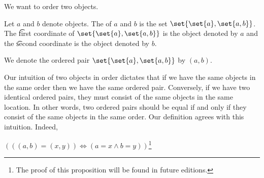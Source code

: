 

We want to order two objects.


Let $a$ and $b$ denote objects.
The  of $a$ and $b$ is the set $\set{\set{a}, \set{a, b}}$.
The \t{first coordinate} of $\set{\set{a}, \set{a, b}}$ is the object denoted by $a$ and the \t{second coordinate} is the object denoted by $b$.



We denote the ordered pair $\set{\set{a},\set{a,b}}$ by $(a, b)$.



Our intuition of two objects in order dictates that if we have the same objects in the same order then we have the same ordered pair.
Conversely, if we have two identical ordered pairs, they must consist of the same objects in the same location.
In other words, two ordered pairs should be equal if and only if they consist of the same objects in the same order.
Our definition agrees with this intuition.
Indeed,

\begin{proposition}
  $(((a, b) = (x, y)) \iff (a = x \land b = y))$\footnote{The proof of this proposition will be found in future editions.%
}
\end{proposition}

\blankpage
